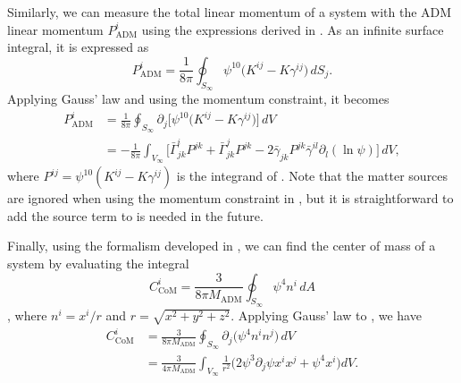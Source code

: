 \documentclass{../document}
\begin{document}
      Similarly, we can measure the total linear momentum of a system with the ADM linear momentum $P_\text{ADM}^i$ using the expressions derived in \cite[]{Serguei}. As an infinite surface integral, it is expressed as
      \begin{equation} \label{eq:Padm-surf}
        P_\text{ADM}^i = \frac{1}{8\pi}
                          \oint_{S_\infty} \psi^{10} \Big(
                            K^{ij} - K \gamma^{ij}
                           \Big) \, dS_j.
      \end{equation}
      Applying Gauss' law and using the momentum constraint, it becomes
      \begin{align}
        P_\text{ADM}^i
        &= \frac{1}{8\pi}
            \oint_{S_\infty} \partial_j \Big[ \psi^{10} \Big(
              K^{ij} - K \gamma^{ij}
            \Big) \Big] \, dV \\
        &= - \frac{1}{8\pi}
              \int_{V_\infty} \Big[
                \bar\Gamma^i_{jk} P^{jk}
                + \bar\Gamma^j_{jk} P^{jk}
                - 2 \bar\gamma_{jk} P^{jk} \bar\gamma^{il}
                                           \partial_l(\ln\psi)
              \Big] \, dV, \label{eq:Padm-vol}
      \end{align}
      where $P^{ij} = \psi^{10} (K^{ij} - K \gamma^{ij})$ is the integrand of \eq{\eqref{eq:Padm-surf}}. Note that the matter sources are ignored when using the momentum constraint in \cite{BaumgarteShapiro}, but it is straightforward to add the source term to \eq{\eqref{eq:Padm-vol}} is needed in the future.

      Finally, using the formalism developed in \cite{Baskaran_2003}, we can find the center of mass of a system by evaluating the integral
      \begin{equation} \label{eq:CoM-surf}
        C_\text{CoM}^i = \frac{3}{8 \pi M_\text{ADM}}
                         \oint_{S_\infty} \psi^4 n^i \, dA
      \end{equation}
      \cite[]{Serguei}, where $n^i = x^i / r$ and $r = \sqrt{x^2 + y^2 + z^2}$. Applying Gauss' law to \eq{\eqref{eq:CoM-surf}}, we have
      \begin{align}
        C_\text{CoM}^i
        &= \frac{3}{8 \pi M_\text{ADM}}
            \oint_{S_\infty} \partial_j \Big( \psi^4 n^i n^j \Big) \, dV \\
        &= \frac{3}{4 \pi M_\text{ADM}}
            \int_{V_\infty} \frac{1}{r^2} \Big(
              2 \psi^3 \partial_j \psi x^i x^j
              + \psi^4 x^i
            \Big) dV.
      \end{align}
\end{document}
